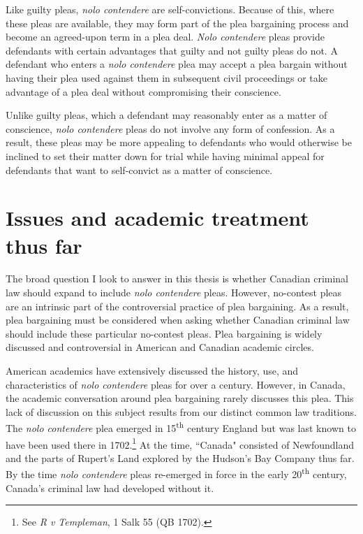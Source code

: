 Like guilty pleas, \textit{nolo contendere} are self-convictions. Because of this, where these pleas are available, they may form part of the plea bargaining process and become an agreed-upon term in a plea deal. \textit{Nolo contendere} pleas provide defendants with certain advantages that guilty and not guilty pleas do not. A defendant who enters a \textit{nolo contendere} plea may accept a plea bargain without having their plea used against them in subsequent civil proceedings or take advantage of a plea deal without compromising their conscience.

Unlike guilty pleas, which a defendant may reasonably enter as a matter of conscience, \textit{nolo contendere} pleas do not involve any form of confession. As a result, these pleas may be more appealing to defendants who would otherwise be inclined to set their matter down for trial while having minimal appeal for defendants that want to self-convict as a matter of conscience.

\section{Issues and academic treatment thus far}

The broad question I look to answer in this thesis is whether Canadian criminal law should expand to include \textit{nolo contendere} pleas. However, no-contest pleas are an intrinsic part of the controversial practice of plea bargaining. As a result, plea bargaining must be considered when asking whether Canadian criminal law should include these particular no-contest pleas. Plea bargaining is widely discussed and controversial in American and Canadian academic circles. 

American academics have extensively discussed the history, use, and characteristics of \textit{nolo contendere} pleas for over a century. However, in Canada, the academic conversation around plea bargaining rarely discusses this plea. This lack of discussion on this subject results from our distinct common law traditions. The \textit{nolo contendere} plea emerged in 15\textsuperscript{th} century England but was last known to have been used there in 1702.\footnote{See \textit{R v Templeman}, 1 Salk 55 (QB 1702).} At the time, ``Canada" consisted of Newfoundland and the parts of Rupert's Land explored by the Hudson's Bay Company thus far. By the time \textit{nolo contendere} pleas re-emerged in force in the early 20\textsuperscript{th} century, Canada's criminal law had developed without it.

